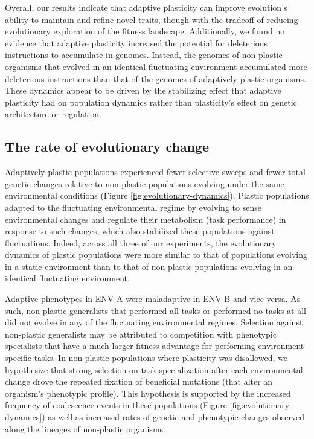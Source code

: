 Overall, our results indicate that adaptive plasticity can improve evolution's ability to maintain and refine novel traits, though with the tradeoff of reducing evolutionary exploration of the fitness landscape.
Additionally, we found no evidence that adaptive plasticity increased the potential for deleterious instructions to accumulate in genomes.
Instead, the genomes of non-plastic organisms that evolved in an identical fluctuating environment accumulated more deleterious instructions than that of the genomes of adaptively plastic organisms. 
These dynamics appear to be driven by the stabilizing effect that adaptive plasticity had on population dynamics rather than plasticity's effect on genetic architecture or regulation.

\vspace{0.25cm}
\subsection{The rate of evolutionary change}

Adaptively plastic populations experienced fewer selective sweeps and fewer total genetic changes relative to non-plastic populations evolving under the same environmental conditions (Figure \ref{fig:evolutionary-dynamics}).
Plastic populations adapted to the fluctuating environmental regime by evolving to sense environmental changes and regulate their metabolism (task performance) in response to such changes, which also stabilized these populations against fluctuations.
Indeed, across all three of our experiments, the evolutionary dynamics of plastic populations were more similar to that of populations evolving in a static environment than to that of non-plastic populations evolving in an identical fluctuating environment.

Adaptive phenotypes in ENV-A were maladaptive in ENV-B and vice versa.
As such, non-plastic generalists that performed all tasks or performed no tasks at all did not evolve in any of the fluctuating environmental regimes.
Selection against non-plastic generalists may be attributed to competition with phenotypic specialists that have a much larger fitness advantage for performing environment-specific tasks.
In non-plastic populations where plasticity was disallowed, we hypothesize that strong selection on task specialization after each environmental change drove the repeated fixation of beneficial mutations (that alter an organism's phenotypic profile).
This hypothesis is supported by the increased frequency of coalescence events in these populations (Figure \ref{fig:evolutionary-dynamics}) as well as increased rates of genetic and phenotypic changes observed along the lineages of non-plastic organisms. 

